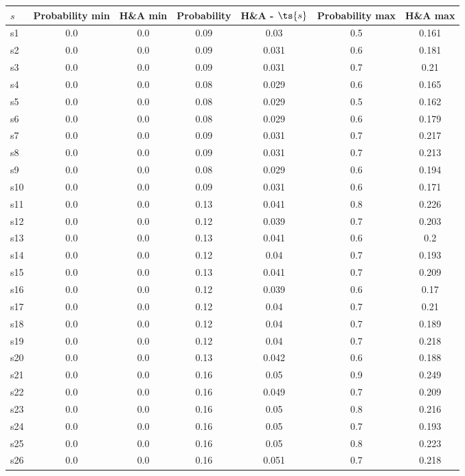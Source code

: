 \documentclass{article}
\begin{document}
\noindent\begin{tabular}{|l|c|c|c|c|c|c|}
\hline
$s$& Probability min & H\&A min & Probability & H\&A - $\ts{s}$ & Probability max & H\&A max\\
\hline
s1 &0.0 & 0.0 & 0.09 & 0.03 & 0.5 & 0.161\\
\hline
s2 &0.0 & 0.0 & 0.09 & 0.031 & 0.6 & 0.181\\
\hline
s3 &0.0 & 0.0 & 0.09 & 0.031 & 0.7 & 0.21\\
\hline
s4 &0.0 & 0.0 & 0.08 & 0.029 & 0.6 & 0.165\\
\hline
s5 &0.0 & 0.0 & 0.08 & 0.029 & 0.5 & 0.162\\
\hline
s6 &0.0 & 0.0 & 0.08 & 0.029 & 0.6 & 0.179\\
\hline
s7 &0.0 & 0.0 & 0.09 & 0.031 & 0.7 & 0.217\\
\hline
s8 &0.0 & 0.0 & 0.09 & 0.031 & 0.7 & 0.213\\
\hline
s9 &0.0 & 0.0 & 0.08 & 0.029 & 0.6 & 0.194\\
\hline
s10 &0.0 & 0.0 & 0.09 & 0.031 & 0.6 & 0.171\\
\hline
s11 &0.0 & 0.0 & 0.13 & 0.041 & 0.8 & 0.226\\
\hline
s12 &0.0 & 0.0 & 0.12 & 0.039 & 0.7 & 0.203\\
\hline
s13 &0.0 & 0.0 & 0.13 & 0.041 & 0.6 & 0.2\\
\hline
s14 &0.0 & 0.0 & 0.12 & 0.04 & 0.7 & 0.193\\
\hline
s15 &0.0 & 0.0 & 0.13 & 0.041 & 0.7 & 0.209\\
\hline
s16 &0.0 & 0.0 & 0.12 & 0.039 & 0.6 & 0.17\\
\hline
s17 &0.0 & 0.0 & 0.12 & 0.04 & 0.7 & 0.21\\
\hline
s18 &0.0 & 0.0 & 0.12 & 0.04 & 0.7 & 0.189\\
\hline
s19 &0.0 & 0.0 & 0.12 & 0.04 & 0.7 & 0.218\\
\hline
s20 &0.0 & 0.0 & 0.13 & 0.042 & 0.6 & 0.188\\
\hline
s21 &0.0 & 0.0 & 0.16 & 0.05 & 0.9 & 0.249\\
\hline
s22 &0.0 & 0.0 & 0.16 & 0.049 & 0.7 & 0.209\\
\hline
s23 &0.0 & 0.0 & 0.16 & 0.05 & 0.8 & 0.216\\
\hline
s24 &0.0 & 0.0 & 0.16 & 0.05 & 0.7 & 0.193\\
\hline
s25 &0.0 & 0.0 & 0.16 & 0.05 & 0.8 & 0.223\\
\hline
s26 &0.0 & 0.0 & 0.16 & 0.051 & 0.7 & 0.218\\

\end{tabular}
\end{document}
